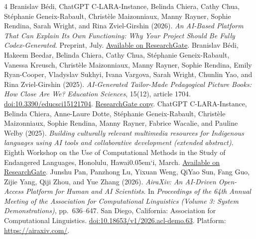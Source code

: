 \documentclass[11pt,a4paper]{article}
\begin{document}
{\small
\begin{thebibliography}{4}
\setlength{\itemsep}{5pt}
 Branislav B\'edi, ChatGPT C-LARA-Instance, Belinda Chiera,
Cathy Chua, Stéphanie Geneix-Rabault, Christèle Maizonniaux, Manny Rayner,
Sophie Rendina, Sarah Wright, and Rina Zviel-Girshin (2026).
\emph{An AI-Based Platform That Can Explain Its Own Functioning:
Why Your Project Should Be Fully Codex-Generated}.
Preprint, July.
\href{https://www.researchgate.net/publication/410729838_An_AI-Based_Platform_That_Can_Explain_Its_Own_Functioning_Why_Your_Project_Should_Be_Fully_Codex-Generated}{Available on ResearchGate}.
 Branislav B\'edi, Hakeem Beedar, Belinda Chiera, Cathy Chua,
Stéphanie Geneix-Rabault, Vanessa Kreusch, Christèle Maizonniaux, Manny Rayner,
Sophie Rendina, Emily Ryan-Cooper, Vladyslav Sukhyi, Ivana Vargova,
Sarah Wright, Chunlin Yao, and Rina Zviel-Girshin (2025).
\emph{AI-Generated Tailor-Made Pedagogical Picture Books: How Close Are We?}
\emph{Education Sciences}, 15(12), article 1704.
\href{https://doi.org/10.3390/educsci15121704}{doi:10.3390/educsci15121704}.
\href{https://www.researchgate.net/publication/398798681_AI-Generated_Tailor-Made_Pedagogical_Picture_Books_How_Close_Are_We}{ResearchGate copy}.
 ChatGPT C-LARA-Instance, Belinda Chiera, Anne-Laure Dotte,
Stéphanie Geneix-Rabault, Christèle Maizonniaux, Sophie Rendina, Manny Rayner,
Fabrice Wacalie, and Pauline Welby (2025).
\emph{Building culturally relevant multimedia resources for Indigenous languages
using AI tools and collaborative development (extended abstract)}.
Eighth Workshop on the Use of Computational Methods in the Study of Endangered
Languages, Honolulu, Hawai\kern0.05em`i, March.
\href{https://www.researchgate.net/publication/389545354_Building_culturally_relevant_multimedia_resources_for_Indigenous_languages_using_AI_tools_and_collaborative_development_extended_abstract}{Available on ResearchGate}.
 Junshu Pan, Panzhong Lu, Yixuan Weng, QiYao Sun, Fang Guo,
Zijie Yang, Qiji Zhou, and Yue Zhang (2026).
\emph{AiraXiv: An AI-Driven Open-Access Platform for Human and AI Scientists}.
In \emph{Proceedings of the 64th Annual Meeting of the Association for
Computational Linguistics (Volume 3: System Demonstrations)}, pp.~636--647.
San Diego, California: Association for Computational Linguistics.
\href{https://doi.org/10.18653/v1/2026.acl-demo.63}{doi:10.18653/v1/2026.acl-demo.63}.
Platform: \url{https://airaxiv.com/}.
\end{thebibliography}}
\end{document}
